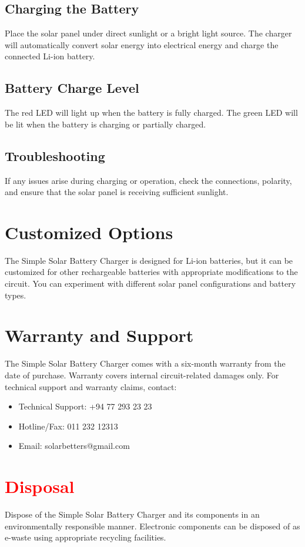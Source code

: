\documentclass[twocolumn]{article}
\begin{document}
\subsection*{Charging the Battery}
Place the solar panel under direct sunlight or a bright light source. The charger will automatically convert solar energy into electrical energy and charge the connected Li-ion battery.

\subsection{Battery Charge Level}
The red LED will light up when the battery is fully charged. The green LED will be lit when the battery is charging or partially charged.

\subsection{Troubleshooting}
If any issues arise during charging or operation, check the connections, polarity, and ensure that the solar panel is receiving sufficient sunlight.

\section{Customized Options}
The Simple Solar Battery Charger is designed for Li-ion batteries, but it can be customized for other rechargeable batteries with appropriate modifications to the circuit. You can experiment with different solar panel configurations and battery types.

\section{Warranty and Support}
The Simple Solar Battery Charger comes with a six-month warranty from the date of purchase. Warranty covers internal circuit-related damages only. For technical support and warranty claims, contact:
\begin{itemize}
  \item Technical Support: +94 77 293 23 23
  \item Hotline/Fax: 011 232 12313
  \item Email: solarbetters@gmail.com
\end{itemize}

\section{\textcolor{red}{Disposal}}
Dispose of the Simple Solar Battery Charger and its components in an environmentally responsible manner. Electronic components can be disposed of as e-waste using appropriate recycling facilities.
\end{document}
